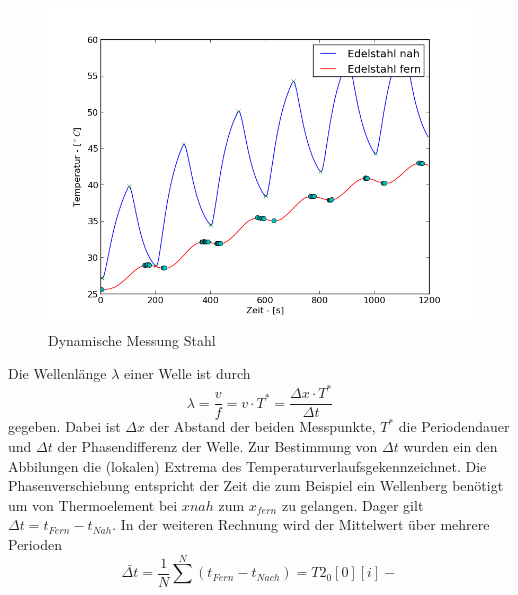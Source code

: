 \documentclass[11pt]{article}
\begin{document}
\begin{figure}[htp]
\centering
\includegraphics[width=\textwidth]{Diagramme/dyn_stahl.png}
\caption{Dynamische Messung Stahl}
\label{dyn_stahl}
\end{figure}\noindent
Die Wellenl\"ange $\lambda$ einer Welle ist durch
\begin{equation}
\lambda = \frac{v}{f} = v\cdot T^* = \frac{\Delta x\cdot  T^* }{\Delta t}
\end{equation}
gegeben. Dabei ist $\Delta x$ der Abstand der beiden Messpunkte, $T^*$ die Periodendauer und $\Delta t$ der Phasendifferenz der Welle. Zur Bestimmung von $\Delta t$ wurden ein den Abbilungen die (lokalen) Extrema des Temperaturverlaufsgekennzeichnet. Die Phasenverschiebung entspricht der Zeit die zum Beispiel ein Wellenberg ben\"otigt um von Thermoelement bei $x{nah}$ zum $x_{fern}$ zu gelangen. Dager gilt $ \Delta t = t_{Fern} - t_{Nah} $. In der weiteren Rechnung wird der Mittelwert \"uber mehrere Perioden
\begin{equation}
\bar{\Delta t} = \frac{1}{N}\sum^N (t_{Fern}- t_{Nach}) = T2_0[0][i]-
\end{equation}
\end{document}
